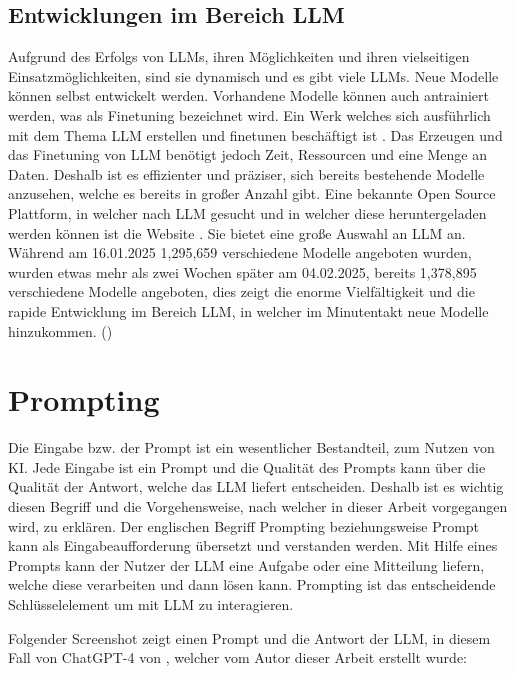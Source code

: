 \documentclass[12pt,toc=bib,toc=listof]{scrreprt}
\begin{document}
\subsection{Entwicklungen im Bereich LLM} %
\label{sec:entwicklungenImBereichLLM}
Aufgrund des Erfolgs von LLMs, ihren Möglichkeiten und ihren vielseitigen Einsatzmöglichkeiten, sind sie dynamisch und es gibt viele LLMs. Neue Modelle können selbst entwickelt werden. Vorhandene Modelle können auch antrainiert werden, was als Finetuning bezeichnet wird. Ein Werk welches sich ausführlich mit dem Thema LLM erstellen und finetunen beschäftigt ist \textcite{Géron2019}. Das Erzeugen und das Finetuning von LLM benötigt jedoch Zeit, Ressourcen und eine Menge an Daten. Deshalb ist es effizienter und präziser, sich bereits bestehende Modelle anzusehen, welche es bereits in großer Anzahl gibt. Eine bekannte Open Source Plattform, in welcher nach LLM gesucht und in welcher diese heruntergeladen werden können ist die Website \textcite{HuggingFace2025}. Sie bietet eine große Auswahl an LLM an. Während am 16.01.2025 1,295,659 verschiedene Modelle angeboten wurden, wurden etwas mehr als zwei Wochen später am 04.02.2025, bereits 1,378,895 verschiedene Modelle angeboten, dies zeigt die enorme Vielfältigkeit und die rapide Entwicklung im Bereich LLM, in welcher im Minutentakt neue Modelle hinzukommen. (\cite{Géron2019})\\

\section{Prompting} %
\label{sec:prompting}
Die Eingabe bzw. der Prompt ist ein wesentlicher Bestandteil, zum Nutzen von KI. Jede Eingabe ist ein Prompt und die Qualität des Prompts kann über die Qualität der Antwort, welche das LLM liefert entscheiden. Deshalb ist es wichtig diesen Begriff und die Vorgehensweise, nach welcher in dieser Arbeit vorgegangen wird, zu erklären. Der englischen Begriff Prompting beziehungsweise Prompt kann als Eingabeaufforderung übersetzt und verstanden werden. Mit Hilfe eines Prompts kann der Nutzer der LLM eine Aufgabe oder eine Mitteilung liefern, welche diese verarbeiten und dann lösen kann. Prompting ist das entscheidende Schlüsselelement um mit LLM zu interagieren.\\
\newpage

\noindent Folgender Screenshot zeigt einen Prompt und die Antwort der LLM, in diesem Fall von ChatGPT-4 von \textcite{OpenAI2025}, welcher vom Autor dieser Arbeit erstellt wurde:
\end{document}
